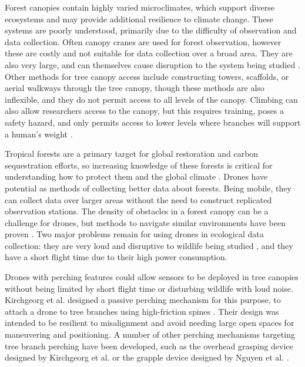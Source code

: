 Forest canopies contain highly varied microclimates, which support diverse ecosystems and may provide additional resilience to climate change.
These systems are poorly understood, primarily due to the difficulty of observation and data collection. Often canopy cranes are used for
forest observation, however these are costly and not suitable for data collection over a broad area.
They are also very large, and can themselves cause disruption to the system being studied \cite{nakamura_forests_2017}.
Other methods for tree canopy access include constructing towers, scaffolds, or aerial walkways through the tree canopy, 
though these methods are also inflexible, and they do not permit access to all levels of the canopy. Climbing can also 
allow researchers access to the canopy, but this requires training, poses a safety hazard, and only permits
access to lower levels where branches will support a human's weight \cite{parker_access_1992}.

Tropical forests are a primary target for global restoration and carbon sequestration efforts,
so increasing knowledge of these forests is critical for understanding how to protect them and the global climate \cite{mrema_ten_2020}.
Drones have potential as methods of collecting better data about forests. Being mobile, they can collect data over larger areas without the
need to construct replicated observation stations. The density of obstacles in a forest canopy can be a challenge for drones, but methods
to navigate similar environments have been proven \cite{mulgaonkar_robust_2018,tan_design_2017,liu_mini-drone_2023}. Two major problems
remain for using drones in ecological data collection: they are very loud and disruptive to wildlife being studied
\cite{jenni-eiermann_unmanned_2017,bennitt_terrestrial_2019}, and they have a short flight time due to their high power consumption.

Drones with perching features could allow sensors to be deployed in tree canopies without being limited by short flight time
or disturbing wildlife with loud noise. Kirchgeorg et al. designed a passive perching mechanism for this purpose, 
to attach a drone to tree branches using high-friction spines \cite{kirchgeorg_hedgehog_2022}. Their design was intended to be resilient to
misalignment and avoid needing large open spaces for maneuvering and positioning.
A number of other perching mechanisms targeting tree branch perching have been developed, such as the overhead grasping 
device designed by Kirchgeorg et al. \cite{kirchgeorg_soft_2023} or the grapple device designed by Nguyen et al. \cite{nguyen_passively_2019}.

